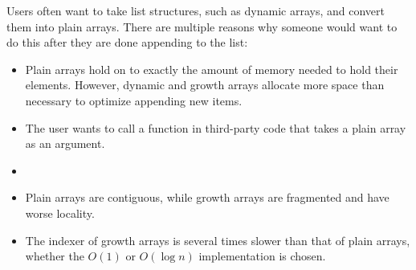 \HdrDescription

Users often want to take list structures, such as dynamic arrays, and convert them into plain arrays. There are multiple reasons why someone would want to do this after they are done appending to the list:

\begin{itemize}
	\item Plain arrays hold on to exactly the amount of memory needed to hold their elements. However, dynamic and growth arrays allocate more space than necessary to optimize appending new items.
	\item The user wants to call a function in third-party code that takes a plain array as an argument.
	\item
	\item Plain arrays are contiguous, while growth arrays are fragmented and have worse locality.
	\item The indexer of growth arrays is several times slower than that of plain arrays, whether the $O(1)$ or $O(\log n)$ implementation is chosen.
\end{itemize}